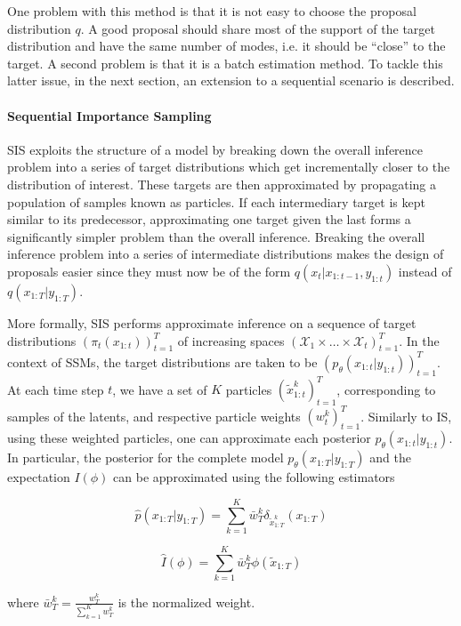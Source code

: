 One problem with this method is that it is not easy to choose the proposal distribution $q$. A good proposal should share most of the support of the target distribution and have the same number of modes, i.e. it should be “close” to the target. A second problem is that it is a batch estimation method. To tackle this latter issue, in the next section, an extension to a sequential scenario is described.

\paragraph{Sequential Importance Sampling}
\gls{SIS} exploits the structure of a model by breaking down the overall inference problem into a series of target distributions which get incrementally closer to the distribution of interest.
These targets are then approximated by propagating a population of samples known as particles. If each intermediary target is kept similar to its predecessor, approximating one target given the last forms a significantly simpler problem than the overall inference.
Breaking the overall inference problem into a series of intermediate distributions makes the design of proposals easier since they must now be of the form $q(x_t|x_{1:t-1},y_{1:t})$ instead of $q(x_{1:T}|y_{1:T})$.

More formally, \gls{SIS} performs approximate inference on a sequence of target distributions
$\left(\pi_t(x_{1:t}) \right)_{t=1}^T$ of increasing spaces 
$\left(\mathcal{X}_1 \times \dots \times \mathcal{X}_t \right)_{t=1}^T$.
In the context of \glspl{SSM}, the target distributions are taken to be
$\left(p_\theta(x_{1:t}|y_{1:t}) \right)_{t=1}^T$.
At each time step $t$, we have a set of $K$ particles $\left(\tilde{x}_{1:t}^k \right)_{t=1}^T$,
corresponding to samples of the latents, and respective particle weights $\left({w}_{t}^k \right)_{t=1}^T$.
Similarly to \gls{IS}, using these weighted particles, one can approximate each posterior
$p_\theta(x_{1:t}|y_{1:t})$.
In particular, the posterior for the complete model $p_\theta(x_{1:T}|y_{1:T})$ and the expectation $I(\phi)$ can be approximated using the following estimators

$$ \hat{p}(x_{1:T}|y_{1:T}) = \sum_{k=1}^K \bar{w}_T^k \delta_{\tilde{x}_{1:T}^k} ({x}_{1:T})$$

$$ \hat{I}(\phi) = \sum_{k=1}^K \bar{w}_T^k \phi(\tilde{x}_{1:T})$$

where $\bar{w}_T^k = \frac{{w}_T^k}{\sum_{k=1}^K {w}_T^k}$ is the normalized weight.




